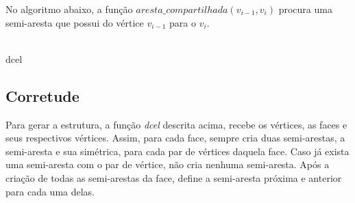 \documentclass{article}
\begin{document}
\hspace*{15pt} No algoritmo abaixo, a função $aresta\_compartilhada(v_{i-1}, v_i)$ procura
uma semi-aresta que possui do vértice $v_{i-1}$ para o $v_i$.\\
\\

\begin{algorithm}[H]
    \SetAlgoLined
    \label{alg1}
    \caption{dcel}
\end{algorithm}

\subsection{Corretude}
\hspace*{15pt}Para gerar a estrutura, a função \textit{dcel} descrita acima,
recebe os vértices, as faces e seus respectivos vértices. Assim, para cada
face, sempre cria duas semi-arestas, a semi-aresta e sua simétrica, para cada
par de vértices daquela face. Caso já exista uma semi-aresta com o par de vértice,
não cria nenhuma semi-aresta. Após a criação de todas as semi-arestas da face,
define a semi-aresta próxima e anterior para cada uma delas.
\\
\newpage



\end{document}
